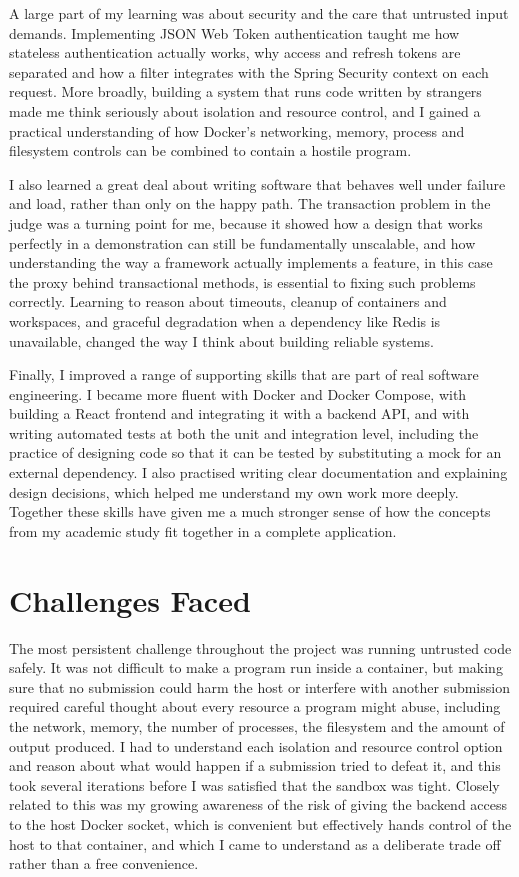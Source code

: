 \documentclass[12pt,a4paper]{report}
\begin{document}
A large part of my learning was about security and the care that untrusted input demands. Implementing JSON Web Token authentication taught me how stateless authentication actually works, why access and refresh tokens are separated and how a filter integrates with the Spring Security context on each request. More broadly, building a system that runs code written by strangers made me think seriously about isolation and resource control, and I gained a practical understanding of how Docker's networking, memory, process and filesystem controls can be combined to contain a hostile program.

I also learned a great deal about writing software that behaves well under failure and load, rather than only on the happy path. The transaction problem in the judge was a turning point for me, because it showed how a design that works perfectly in a demonstration can still be fundamentally unscalable, and how understanding the way a framework actually implements a feature, in this case the proxy behind transactional methods, is essential to fixing such problems correctly. Learning to reason about timeouts, cleanup of containers and workspaces, and graceful degradation when a dependency like Redis is unavailable, changed the way I think about building reliable systems.

Finally, I improved a range of supporting skills that are part of real software engineering. I became more fluent with Docker and Docker Compose, with building a React frontend and integrating it with a backend API, and with writing automated tests at both the unit and integration level, including the practice of designing code so that it can be tested by substituting a mock for an external dependency. I also practised writing clear documentation and explaining design decisions, which helped me understand my own work more deeply. Together these skills have given me a much stronger sense of how the concepts from my academic study fit together in a complete application.

\chapter*{Challenges Faced}

The most persistent challenge throughout the project was running untrusted code safely. It was not difficult to make a program run inside a container, but making sure that no submission could harm the host or interfere with another submission required careful thought about every resource a program might abuse, including the network, memory, the number of processes, the filesystem and the amount of output produced. I had to understand each isolation and resource control option and reason about what would happen if a submission tried to defeat it, and this took several iterations before I was satisfied that the sandbox was tight. Closely related to this was my growing awareness of the risk of giving the backend access to the host Docker socket, which is convenient but effectively hands control of the host to that container, and which I came to understand as a deliberate trade off rather than a free convenience.
\end{document}
